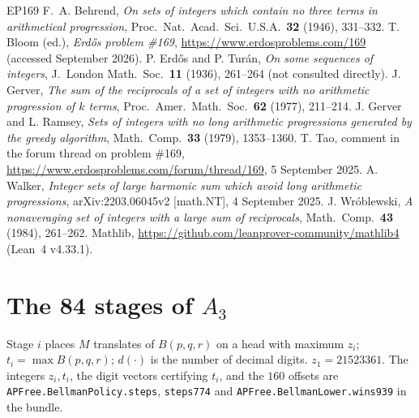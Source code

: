 \documentclass[11pt,a4paper]{article}
\theoremstyle{definition}
\theoremstyle{remark}
\newcommand{\Blk}{B}
\newcommand{\code}[1]{\texttt{#1}}
\begin{document}
\begin{thebibliography}{EP169}
 F.~A. Behrend, \emph{On sets of integers which contain no three terms in arithmetical progression}, Proc.\ Nat.\ Acad.\ Sci.\ U.S.A.\ \textbf{32} (1946), 331--332.
 T. Bloom (ed.), \emph{Erd\H{o}s problem \#169}, \url{https://www.erdosproblems.com/169} (accessed September 2026).
 P. Erd\H{o}s and P. Tur\'an, \emph{On some sequences of integers}, J.\ London Math.\ Soc.\ \textbf{11} (1936), 261--264 (not consulted directly).
 J. Gerver, \emph{The sum of the reciprocals of a set of integers with no arithmetic progression of $k$ terms}, Proc.\ Amer.\ Math.\ Soc.\ \textbf{62} (1977), 211--214.
 J. Gerver and L. Ramsey, \emph{Sets of integers with no long arithmetic progressions generated by the greedy algorithm}, Math.\ Comp.\ \textbf{33} (1979), 1353--1360.
 T. Tao, comment in the forum thread on problem \#169, \url{https://www.erdosproblems.com/forum/thread/169}, 5 September 2025.
 A. Walker, \emph{Integer sets of large harmonic sum which avoid long arithmetic progressions}, arXiv:2203.06045v2 [math.NT], 4 September 2025.
 J. Wr\'oblewski, \emph{A nonaveraging set of integers with a large sum of reciprocals}, Math.\ Comp.\ \textbf{43} (1984), 261--262.
 Mathlib, \url{https://github.com/leanprover-community/mathlib4} (Lean~4 v4.33.1).
\end{thebibliography}

\appendix
\section{The 84 stages of \texorpdfstring{$A_3$}{A3}}\label{app:stages3}

Stage $i$ places $M$ translates of $\Blk(p,q,r)$ on a head with maximum $z_i$; $t_i=\max\Blk(p,q,r)$; $d(\cdot)$ is the number of decimal digits. $z_1=21523361$. The integers $z_i, t_i$, the digit vectors certifying $t_i$, and the $160$ offsets are \code{APFree.\allowbreak{}BellmanPolicy.\allowbreak{}steps}, \code{steps774} and \code{APFree.\allowbreak{}BellmanLower.\allowbreak{}wins939} in the bundle.
\end{document}
